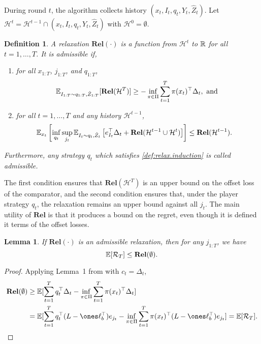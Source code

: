 \documentclass{article}
\newcommand{\regret}{\mathcal{R}}
\newcommand{\rel}{\mathbf{Rel}}
\newcommand{\hist}{{\mathcal H}}
\newtheorem{definition}{Definition}
\newtheorem{lemma}{Lemma}
\begin{document}
During round $t$, the algorithm collects history $(x_t, I_t, q_t, Y_t, \hat Z_t)$. Let $\hist^{t} = \hist^{t-1}\cap (x_t, I_t, q_t, Y_t, \hat Z_t)$ with $\hist^0=\emptyset$.
\begin{definition}
  A relaxation $\rel(\cdot)$ is a function from $\hist^{t}$ to $\mathbb R$ for all $t=1,\ldots, T$. It is admissible if,
  \begin{enumerate}
    \item for all $x_{1:T}$, $j_{1:T}$, and $q_{1:T}$,
  \begin{equation}\label{def:relax.base}
    \ex_{I_{1:T}\sim q_{1:T},\hat Z_{1:T}}[\rel(\hist^{T})] \geq -\inf_{\pi\in\Pi} \sum_{t=1}^T \pi(x_t)^\top \Delta_t, \text{ and }
      \end{equation}
  \item for all $t=1,\ldots,T$ and any history $\hist^{t-1}$,
  \begin{align}\label{def:relax.induction}
    &\ex_{x_t}\left[ \inf_{q_t} \sup_{j_t } \ex_{I_t\sim q_t, \hat Z_t}\left[ e_{I_t}^\top \Delta_t + \rel(\hist^{t-1}\cup \hist^t)\right]\right]
      \leq \rel(\hist^{t-1}).
  \end{align}
\end{enumerate}
  Furthermore, any strategy $q_t$ which satisfies \eqref{def:relax.induction} is called admissible. 
\end{definition}
The first condition ensures that $\rel(\hist^T)$ is an upper bound on the offset loss of the comparator, and the second condition ensures that, under the player strategy $q_t$, the relaxation remains an upper bound against all $j_t$. The main utility of $\rel$ is that it produces a bound on the regret, even though it is defined it terms of the offset losses.
\begin{lemma}\label{lem:relaxation.to.regret}
  If $\rel(\cdot)$ is an admissible relaxation, then for any $j_{1:T}$, we have
  \begin{equation*}
    \ex[\Regret_T] \leq \rel(\emptyset).
  \end{equation*}
\end{lemma}
\begin{proof}
  Applying Lemma~1 from \citet{rakhlin2016bistro} with $c_t = \Delta_t$,
\  \begin{align*}
    \rel(\emptyset)&\geq \ex[\sum_{t=1}^T q_t^\top \Delta_t - \inf_{\pi\in\Pi}\sum_{t=1}^T \pi(x_t)^\top\Delta_t]\\
     &=
       \ex[\sum_{t=1}^T q_t^\top(L -\ones\ell_b^\top)  e_{j_t}
       -
       \inf_{\pi\in\Pi}\sum_{t=1}^T \pi(x_t)^\top(L -\ones\ell_b^\top)  e_{j_t}]= \ex[\regret_T] .
  \end{align*}
\end{proof}
\end{document}
